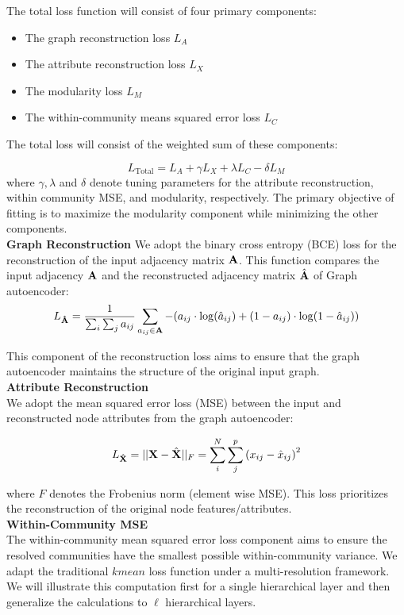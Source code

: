 \documentclass[a4paper,12pt]{article}
\begin{document}
\begin{itemize}
\begin{enumerate}
{{\begin{enumerate}
{					The total loss function will consist of four primary components: 
					\begin{itemize}
						\item The graph reconstruction loss ${L}_A$
						\item The attribute reconstruction loss ${L}_X$
						\item The modularity loss ${L}_M$
						\item The within-community means squared error loss ${L}_C$
					\end{itemize}
					The total loss will consist of the weighted sum of these components:
					
					\[L_{\text{Total}} = L_A + \gamma L_X + \lambda L_{C} - \delta L_M \]
					where $\gamma, \lambda$ and $\delta$ denote tuning parameters for the attribute reconstruction, within community MSE, and modularity, respectively. The primary objective of fitting is to maximize the modularity component while minimizing the other components. \\
					
					\textbf{Graph Reconstruction}
					We adopt the binary cross entropy (BCE) loss for the reconstruction of the input adjacency matrix ${\bf A}$. This function compares the input adjacency $\bf A$ and the reconstructed adjacency matrix  $\hat{\bf A}$ of Graph autoencoder: 
					\[L_{\bf \hat{A}} = \frac{1}{\sum_i\sum_j a_{ij}} \sum_{a_{ij}\in {\bf A}} -(a_{ij} \cdot\log(\hat{a}_{ij})+(1 - a_{ij})\cdot\log(1 - \hat{a}_{ij})) \]
					
					This component of the reconstruction loss aims to ensure that the graph autoencoder maintains the structure of the original input graph. \\
					
					
					\textbf{Attribute Reconstruction}\\
					We adopt the mean squared error loss (MSE) between the input and reconstructed node attributes from the graph autoencoder:
					
					\[L_{\bf \hat{X}} = ||{\bf X} - \hat{\bf X}||_F = \sum_i^N \sum_j^p \left(x_{ij} - \hat{x}_{ij}\right)^2 \]
					
					where $F$ denotes the Frobenius norm (element wise MSE). 
					This loss prioritizes the reconstruction of the original node features/attributes. \\
					
					
					\textbf{Within-Community MSE}\\
					The within-community mean squared error loss component aims to ensure the resolved communities have the smallest possible within-community variance. We adapt the traditional $kmean$ loss function under a multi-resolution framework. We will illustrate this computation first for a single hierarchical layer and then generalize the calculations to $\ell$ hierarchical layers. \\
					
}
\end{enumerate}}}
\end{enumerate}
\end{itemize}
\end{document}
